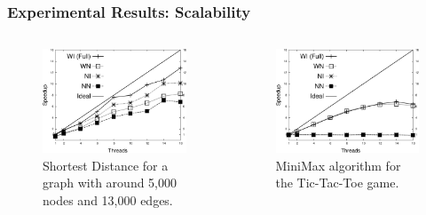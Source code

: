 \documentclass{beamer}
\begin{document}
\begin{frame}[fragile]
   \frametitle{Experimental Results: Scalability}
   \begin{columns}[t]
      \begin{figure}[b]
         \includegraphics[width=\textwidth]{../figures/results-shortest-uspowergrid.pdf}
         \caption{Shortest Distance for a graph with around 5,000 nodes and 13,000 edges.}
      \end{figure}
      \begin{figure}[b]
         \includegraphics[width=\textwidth]{../figures/results-minimax.pdf}
         \caption{MiniMax algorithm for the Tic-Tac-Toe game.}
      \end{figure}
   \end{columns}
\end{frame}
\end{document}
